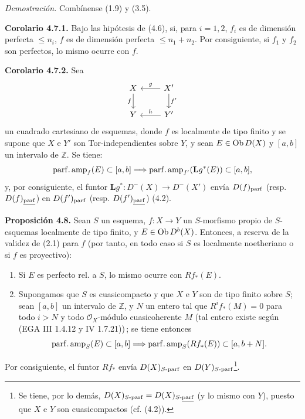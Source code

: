 \providecommand{\sisi}[2]{#2}

\emph{Demostración.} Combínense (1.9) y (3.5).

\textbf{Corolario 4.7.1.} Bajo las hipótesis de (4.6), si, para \(i=1,2\), \(f_i\) es de dimensión perfecta \(\leq n_i\), \(f\) es de dimensión perfecta \(\leq n_1+n_2\). Por consiguiente, si \(f_1\) y \(f_2\) son perfectos, lo mismo ocurre con \(f\).

\textbf{Corolario 4.7.2.} Sea
\[
\begin{tikzcd}
X \arrow[d,"f"'] & X' \arrow[l,"g"'] \arrow[d,"f'"]\\
Y & Y' \arrow[l,"h"']
\end{tikzcd}
\]
un cuadrado cartesiano de esquemas, donde \(f\) es localmente de tipo finito y se supone que \(X\) e \(Y'\) son Tor-independientes sobre \(Y\), y sean \(E\in\operatorname{Ob} D(X)\) y \([a,b]\) un intervalo de \(\mathbb Z\). Se tiene:
\[
 \operatorname{parf.amp}_f(E)\subset[a,b]\Longrightarrow\operatorname{parf.amp}_{f'}(\mathbf Lg^*(E))\subset[a,b],
\]
y, por consiguiente, el funtor \(\mathbf Lg^*:D^-(X)\to D^-(X')\) envía \(D(f)_{\mathrm{parf}}\) (resp. \(D(f)_{\uparf}\)) en \(D(f')_{\mathrm{parf}}\) (resp. \(D(f')_{\uparf}\)) (4.2).

\textbf{Proposición 4.8.} Sean \(S\) un esquema, \(f:X\to Y\) un \(S\)-morfismo propio de \(S\)-esquemas localmente de tipo finito, y \(E\in\operatorname{Ob} D^b(X)\). Entonces, a reserva de la validez de (2.1) para \(f\) (por tanto, en todo caso si \(S\) es localmente noetheriano o si \(f\) es proyectivo):
\begin{enumerate}[label=\alph*)]
\item Si \(E\) es perfecto rel. a \(S\), lo mismo ocurre con \(Rf_*(E)\).
\item Supongamos que \(S\) es cuasicompacto y que \(X\) e \(Y\) son de tipo finito sobre \(S\); sean \([a,b]\) un intervalo de \(\mathbb Z\), y \(N\) un entero tal que \(R^if_*(M)=0\) para todo \(i>N\) y todo \(\mathcal O_X\)-módulo cuasicoherente \(M\) (tal entero existe según (EGA III 1.4.12 y IV 1.7.21))\,; se tiene entonces
\[
 \operatorname{parf.amp}_S(E)\subset[a,b]\Longrightarrow\operatorname{parf.amp}_S(Rf_*(E))\subset[a,b+N].
\]
\end{enumerate}
Por consiguiente, el funtor \(Rf_*\) envía \(D(X)_{S\text{-}\mathrm{parf}}\) en \(D(Y)_{S\text{-}\mathrm{parf}}\)\footnote{Se tiene, por lo demás, \(D(X)_{S\text{-}\parf}=D(X)_{S\text{-}\uparf}\) (y lo mismo con \(Y\)), puesto que \(X\) e \(Y\) son cuasicompactos (cf. (4.2)).}.

